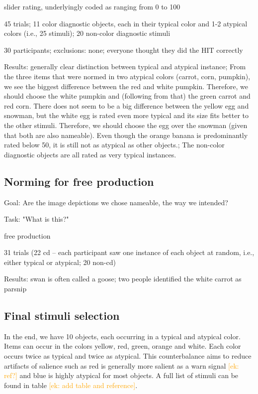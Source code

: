 \documentclass[a4paper,man,floatsintext,natbib,donotrepeattitle]{apa6}
\newcommand{\ek}[1]{\textcolor{Orange}{[ek: #1]}}
\begin{document}
slider rating, underlyingly coded as ranging from 0 to 100

45 trials;
11 color diagnostic objects, each in their typical color and 1-2 atypical colors (i.e., 25 stimuli); 20 non-color diagnostic stimuli

30 participants;
exclusions: none; everyone thought they did the HIT correctly

Results: generally clear distinction between typical and atypical instance;
From the three items that were normed in two atypical colors (carrot, corn, pumpkin), we see the biggest difference between the red and white pumpkin. Therefore, we should choose the white pumpkin and (following from that) the green carrot and red corn.
There does not seem to be a big difference between the yellow egg and snowman, but the white egg is rated even more typical and its size fits better to the other stimuli. Therefore, we should choose the egg over the snowman (given that both are also nameable).
Even though the orange banana is predominantly rated below 50, it is still not as atypical as other objects.;
The non-color diagnostic objects are all rated as very typical instances.

\subsection{Norming for free production}

Goal: Are the image depictions we chose nameable, the way we intended?

Task: "What is this?"

free production

31 trials (22 cd -- each participant saw one instance of each object at random, i.e., either typical or atypical; 20 non-cd)

Results: swan is often called a goose; two people identified the white carrot as parsnip

\subsection{Final stimuli selection}

In the end, we have 10 objects, each occurring in a typical and atypical color.
Items can occur in the colors yellow, red, green, orange and white. Each color occurs twice as typical and twice as atypical. This counterbalance aims to reduce artifacts of salience such as red is generally more salient as a warn signal \ek{ref?} and blue is highly atypical for most objects. A full list of stimuli can be found in table \ek{add table and reference}.
\end{document}
